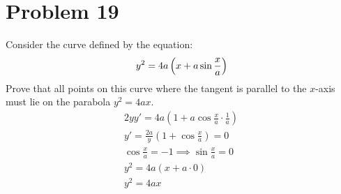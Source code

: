 \documentclass[12pt]{article}
\newcommand*{\paren}[1]{\ensuremath\left(#1\right)}
\newcommand{\problem}[1]{\section{Problem #1}}
\begin{document}
\problem{19}
Consider the curve defined by the equation:
\[
y^2=4a\paren{x+a\sin \frac{x}{a}}
\]
Prove that all points on this curve where the tangent is parallel to the $x$-axis must lie on the parabola
$y^2 = 4ax$.
\begin{gather*}
    2yy'=4a(1+a\cos \frac{x}{a} \cdot \frac{1}{a})\\
    y'=\frac{2a}{y}(1+\cos \frac{x}{a})=0\\
    \cos \frac{x}{a}=-1 \implies \sin  \frac{x}{a}=0\\
    y^2=4a(x+a\cdot 0)\\
    \boxed{y^2=4ax}
\end{gather*}
\end{document}
